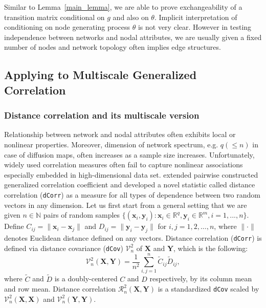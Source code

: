 \documentclass[12pt]{article}
\theoremstyle{definition}
\begin{document}
Similar to Lemma~\ref{main_lemma}, we are able to prove exchangeability of a transition matrix conditional on $g$ and also on $\theta$. Implicit interpretation of conditioning on node generating process $\theta$ is not very clear. However in testing independence between networks and nodal attributes, we are usually given a fixed number of nodes and network topology often implies edge structures. 
	
\subsection{Applying to Multiscale Generalized Correlation}
	
\subsubsection{Distance correlation and its multiscale version}
	
Relationship between network and nodal attributes often exhibits local or nonlinear properties. Moreover, dimension of network spectrum, e.g. $q (\leq n)$ in case of diffusion maps, often increases as a sample size increases. Unfortunately, widely used correlation measures often fail to capture nonlinear associations especially embedded in high-dimensional data set. \cite{szekely2007measuring} extended pairwise constructed generalized correlation coefficient and developed a novel statistic called distance correlation (\texttt{dCorr}) as a measure for all types of dependence between two random vectors in any dimension. Let us first start from a general setting that we are given $n \in \mathbb{N}$ pairs of random samples $\{ (\mathbf{x}_{i}, \mathbf{y}_{i}) : \mathbf{x}_{i} \in \mathbb{R}^{q}, \mathbf{y}_{i} \in \mathbb{R}^{m}, i = 1,...,n \}$. Define $C_{ij} = \parallel \mathbf{x}_{i} - \mathbf{x}_{j} \parallel$ and $D_{ij} = \parallel \mathbf{y}_{i} - \mathbf{y}_{j} \parallel$ for $i,j=1,2, \ldots ,n$, where $\parallel \cdot \parallel$ denotes Euclidean distance defined on any vectors.   
Distance correlation (\texttt{dCorr}) is defined via distance covariance (\texttt{dCov}) $\mathcal{V}^2_{n}$ of $\mathbf{X}$ and $\mathbf{Y}$, which is the following: 
\begin{equation}	 
\mathcal{V}^2_{n}(\boldsymbol{X}, \boldsymbol{Y}) = \frac{1}{n^2} \sum\limits_{i,j=1}^{n} \tilde{C}_{ij} \tilde{D}_{ij},
\end{equation}
where $\tilde{C}$ and $\tilde{D}$ is a doubly-centered $C$ and $D$ respectively, by its column mean and row mean. Distance correlation $\mathcal{R}^{2}_{n}(\mathbf{X}, \mathbf{Y})$ is a standardized \texttt{dCov} scaled by $\mathcal{V}^2_{n}(\boldsymbol{X}, \boldsymbol{X})$ and $\mathcal{V}^2_{n}(\boldsymbol{Y}, \boldsymbol{Y}).$
\end{document}
